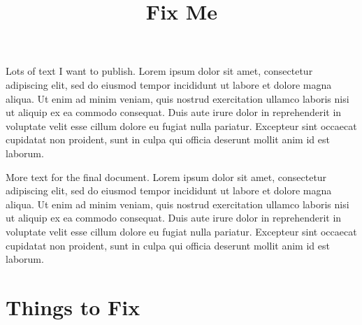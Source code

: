 \documentclass[12pt]{article}
\title{Fix Me}
\begin{document}
Lots of text I want to publish. Lorem ipsum dolor sit amet, consectetur adipiscing elit, sed do eiusmod tempor incididunt ut labore et dolore magna aliqua. Ut enim ad minim veniam, quis nostrud exercitation ullamco laboris nisi ut aliquip ex ea commodo consequat. Duis aute irure dolor in reprehenderit in voluptate velit esse cillum dolore eu fugiat nulla pariatur. Excepteur sint occaecat cupidatat non proident, sunt in culpa qui officia deserunt mollit anim id est laborum.

More text for the final document. Lorem ipsum dolor sit amet, consectetur adipiscing elit, sed do eiusmod tempor incididunt ut labore et dolore magna aliqua. Ut enim ad minim veniam, quis nostrud exercitation ullamco laboris nisi ut aliquip ex ea commodo consequat. Duis aute irure dolor in reprehenderit in voluptate velit esse cillum dolore eu fugiat nulla pariatur. Excepteur sint occaecat cupidatat non proident, sunt in culpa qui officia deserunt mollit anim id est laborum.

\immediate{}

\section{Things to Fix}
\begin{itemize}
	
\end{itemize}
\end{document}
